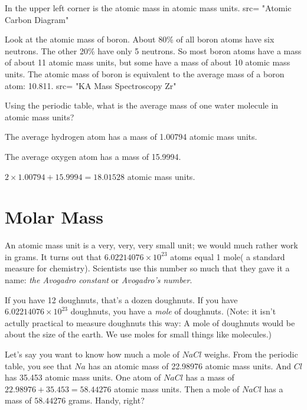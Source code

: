 In the upper left corner is the atomic mass in atomic mass units.
\img src= "Atomic Carbon Diagram"
 
Look at the atomic mass of boron. About 80\% of all boron atoms have
six neutrons. The other 20\% have only 5 neutrons. So most boron atoms
have a mass of about 11 atomic mass units, but some have a mass of
about 10 atomic mass units. The atomic mass of boron is equivalent to the average
mass of a boron atom: 10.811.
\img src= "KA Mass Spectroscopy Zr"

\begin{Exercise}[title={Mass of a Water Molecule}, label=water_mass]
  
Using the periodic table, what is the average mass of one water molecule in atomic mass units?

\end{Exercise}
\begin{Answer}[ref=water_mass]

  The average hydrogen atom has a mass of 1.00794 atomic mass units.

  The average oxygen atom has a mass of 15.9994.

  $2 \times 1.00794 + 15.9994 = 18.01528$ atomic mass units.
   
\end{Answer}

\section{Molar Mass}

An atomic mass unit is a very, very, very small unit; we would much
rather work in grams.  It turns out that $6.02214076 \times 10^{23}$
atoms equal 1 mole( a standard measure for chemistry). Scientists use this number so much
that they gave it a name: \textit{the Avogadro constant} or
\textit{Avogadro's number}.

If you have 12 doughnuts, that's a dozen doughnuts.  If you have
$6.02214076 \times 10^{23}$ doughnuts, you have a \textit{mole} of
doughnuts. (Note: it isn't actully practical to measure doughnuts this
way: A mole of doughnuts would be about the size of the earth. We use
moles for small things like molecules.)

Let's say you want to know how much a mole of $NaCl$ weighs. From the
periodic table, you see that $Na$ has an atomic mass of 22.98976
atomic mass units. And $Cl$ has 35.453 atomic mass units.  One atom of
$NaCl$ has a mass of $22.98976 + 35.453 = 58.44276$ atomic mass units.
Then a mole of $NaCl$ has a mass of $58.44276$ grams. Handy, right?

